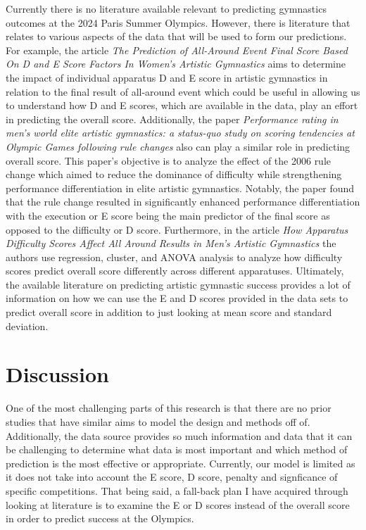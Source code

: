 \documentclass[12pt]{article}
\begin{document}
Currently there is no literature available relevant to predicting gymnastics outcomes at the 2024 
Paris Summer Olympics. However, there is literature that relates to various aspects of the data that 
will be used to form our predictions. For example, the article \textit{The Prediction of All-Around 
Event Final Score Based On D and E Score Factors In Women's Artistic Gymnastics} aims to determine the 
impact of individual apparatus D and E score in artistic gymnastics in relation to the final result of 
all-around event which could be useful in allowing us to understand how D and E scores, which are 
available in the data, play an effort in predicting the overall score. Additionally, the paper 
\textit{Performance rating in men’s world elite artistic gymnastics: a status-quo study on scoring 
tendencies at Olympic Games following rule changes} also can play a similar role in predicting overall 
score. This paper's objective is to analyze the effect of the 2006 rule change which aimed to reduce the 
dominance of difficulty while strengthening performance differentiation  in elite artistic gymnastics. 
Notably, the paper found that the rule change resulted in significantly enhanced performance 
differentiation with the execution or E score being the main predictor of the final score as opposed to 
the difficulty or D score. Furthermore, in the article \textit{How Apparatus Difficulty Scores Affect All 
Around Results in Men's Artistic Gymnastics} the authors use regression, cluster, and ANOVA analysis to 
analyze how difficulty scores predict overall score differently across different apparatuses. Ultimately, 
the available literature on predicting artistic gymnastic success provides a lot of information on how we 
can use the E and D scores provided in the data sets to predict overall score in addition to just looking 
at mean score and standard deviation.

\section{Discussion}
\label{sec:dis}

One of the most challenging parts of this research is that there are no prior studies that have similar
aims to model the design and methods off of. Additionally, the data source provides so much information
and data that it can be challenging to determine what data is most important and which method of prediction
is the most effective or appropriate. Currently, our model is limited as it does not take into account the 
E score, D score, penalty and signficance of specific competitions. That being said, a fall-back plan I have 
acquired through looking at literature is to examine the E or D scores instead of the overall score in order 
to predict success at the Olympics. 
\end{document}
